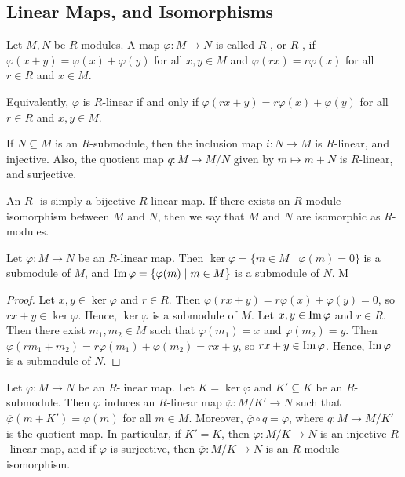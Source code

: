 \subsection{Linear Maps, and Isomorphisms}

\begin{definition}
    Let $M,N$ be $R$-modules. A map $\varphi:M \to N$ is called $R$-, or $R$-, if $\varphi(x+y) = \varphi(x) + \varphi(y)$ for all $x,y \in M$ and $\varphi(rx) = r\varphi(x)$ for all $r \in R$ and $x \in M$.
\end{definition}

Equivalently, $\varphi$ is $R$-linear if and only if $\varphi(rx+y) = r\varphi(x) + \varphi(y)$ for all $r \in R$ and $x,y \in M$.

\begin{example}
    If $N \subseteq M$ is an $R$-submodule, then the inclusion map $i:N \to M$ is $R$-linear, and injective. Also, the quotient map $q:M \to M/N$ given by $m \mapsto m + N$ is $R$-linear, and surjective. 
\end{example}

An $R$- is simply a bijective $R$-linear map. If there exists an $R$-module isomorphism between $M$ and $N$, then we say that $M$ and $N$ are isomorphic as $R$-modules.

\begin{proposition}
    Let $\varphi : M \to N$ be an $R$-linear map. Then $\ker \varphi = \{m \in M \mid \varphi(m) = 0\}$ is a submodule of $M$, and $\operatorname{Im} \varphi = \{\varphi(m) \mid m \in M\}$ is a submodule of $N$. M
\end{proposition}
\begin{proof}
    Let $x,y \in \ker \varphi$ and $r \in R$. Then $\varphi(rx+y) = r\varphi(x) + \varphi(y) = 0$, so $rx+y \in \ker \varphi$. Hence, $\ker \varphi$ is a submodule of $M$. Let $x,y \in \operatorname{Im} \varphi$ and $r \in R$. Then there exist $m_{1},m_{2} \in M$ such that $\varphi(m_{1}) = x$ and $\varphi(m_{2}) = y$. Then $\varphi(rm_{1}+m_{2}) = r\varphi(m_{1}) + \varphi(m_{2}) = rx + y$, so $rx+y \in \operatorname{Im} \varphi$. Hence, $\operatorname{Im} \varphi$ is a submodule of $N$.
\end{proof}

\begin{theorem}
    Let $\varphi : M \to N$ be an $R$-linear map. Let $K = \ker \varphi$ and $K' \subseteq K$ be an $R$-submodule. Then $\varphi$ induces an $R$-linear map $\overline{\varphi} : M/K' \to N$ such that $\overline{\varphi}(m+K') = \varphi(m)$ for all $m \in M$. Moreover, $\overline{\varphi} \circ q = \varphi$, where $q : M \to M/K'$ is the quotient map. In particular, if $K' = K$, then $\overline{\varphi} : M/K \to N$ is an injective $R$-linear map, and if $\varphi$ is surjective, then $\overline{\varphi} : M/K \to N$ is an $R$-module isomorphism.
\end{theorem}


